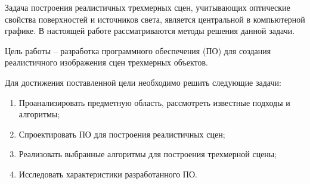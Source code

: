
Задача построения реалистичных трехмерных сцен, учитывающих оптические свойства поверхностей и источников света, является центральной в компьютерной графике. В настоящей работе рассматриваются методы решения данной задачи.

Цель работы -- разработка программного обеспечения (ПО) для создания реалистичного изображения сцен трехмерных объектов.

Для достижения поставленной цели необходимо решить следующие задачи:
\begin{enumerate}
	\item Проанализировать предметную область, рассмотреть известные подходы и алгоритмы;
	\item Спроектировать ПО для построения реалистичных сцен;
	\item Реализовать выбранные алгоритмы для построения трехмерной сцены;
	\item Исследовать характеристики разработанного ПО.
\end{enumerate}

\clearpage
